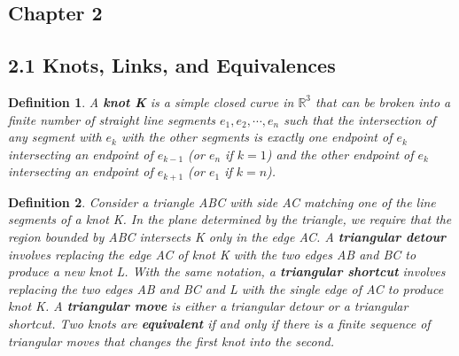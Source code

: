 \documentclass[executivepaper]{article}
\newtheorem{definition}{Definition}
\begin{document}
\begin{center}

\section*{Chapter 2}

\end{center}

\subsection*{2.1 Knots, Links, and Equivalences}

\begin{tcolorbox}

\begin{definition}

\textit{A \textbf{knot K} is a simple closed curve in $\mathbb{R}^{3}$ that can be broken into a finite number of straight line segments $e_{1}, e_{2}, \cdots, e_{n}$ such that the intersection of any segment with $e_{k}$ with the other segments is exactly one endpoint of $e_{k}$ intersecting an endpoint of $e_{k-1}$ (or $e_{n}$ if $k=1$) and the other endpoint of $e_{k}$ intersecting an endpoint of $e_{k+1}$ (or $e_{1}$ if $k=n$).}

\end{definition}

\end{tcolorbox}

\pagebreak

\vspace*{-30mm}

\begin{tcolorbox}

\begin{definition}

\textit{Consider a triangle ABC with side AC matching one of the line segments of a knot K. In the plane determined by the triangle, we require that the region bounded by ABC intersects K only in the edge AC. A \textbf{triangular detour} involves replacing the edge AC of knot K with the two edges AB and BC to produce a new knot L. With the same notation, a \textbf{triangular shortcut} involves replacing the two edges AB and BC and L with the single edge of AC to produce knot K. A \textbf{triangular move} is either a triangular detour or a triangular shortcut. Two knots are \textbf{equivalent} if and only if there is a finite sequence of triangular moves that changes the first knot into the second.}

\end{definition}

\end{tcolorbox}
\end{document}
